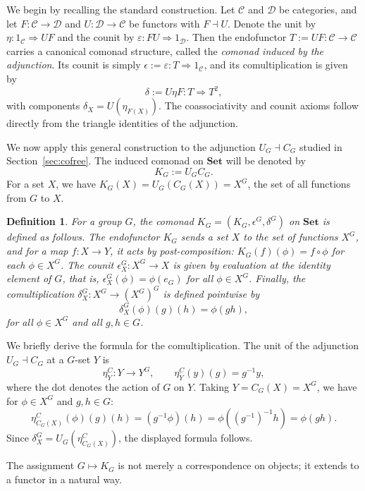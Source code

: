 \documentclass{amsart}
\newtheorem{definition}{Definition}
\begin{document}
 
We begin by recalling the standard construction. Let $\mathcal C$ and $\mathcal D$ be categories, and let $F \colon \mathcal C \rightarrow \mathcal D$ and $U \colon \mathcal D \rightarrow \mathcal C$ be functors with $F \dashv U$.  Denote the unit by $\eta \colon 1_{\mathcal C} \Rightarrow U F$ and the counit by $\varepsilon \colon F U \Rightarrow 1_{\mathcal D}$. Then the endofunctor $T := U F \colon \mathcal C \rightarrow \mathcal C$ carries a canonical comonad structure, called the \emph{comonad induced by the adjunction}. Its counit is simply $\epsilon := \varepsilon \colon T \Rightarrow 1_{\mathcal C}$, and its comultiplication is given by
\[
\delta := U \eta F \colon T \Rightarrow T^2,
\]
with components $\delta_X = U(\eta_{F(X)})$. The coassociativity and counit axioms follow directly from the triangle identities of the adjunction.


We now apply this general construction to the adjunction $U_G \dashv C_G$ studied in Section~\ref{sec:cofree}. The induced comonad on $\mathbf{Set}$ will be denoted by
\[
K_G := U_G C_G.
\]
For a set $X$, we have $K_G(X) = U_G(C_G(X)) = X^G$, the set of all functions from $G$ to $X$.

\begin{definition}
For a group $G$, the comonad $K_G = (K_G, \epsilon^G, \delta^G)$ on $\mathbf{Set}$ is defined as follows. The endofunctor $K_G$ sends a set $X$ to the set of functions $X^G$, and for a map $f: X \rightarrow Y$, it acts by post-composition: $K_G(f)(\phi) = f \circ \phi$ for each $\phi \in X^G$. The counit $\epsilon_X^G: X^G \rightarrow X$ is given by evaluation at the identity element of $G$, that is, $\epsilon_X^G(\phi) = \phi(e_G)$ for all $\phi \in X^G$. Finally, the comultiplication $\delta_X^G: X^G \rightarrow (X^G)^G$ is defined pointwise by
\[
\delta_X^G(\phi)(g)(h) = \phi(gh),
\]
for all $\phi \in X^G$ and all $g, h \in G$.
\end{definition}

We briefly derive the formula for the comultiplication. The unit of the adjunction $U_G \dashv C_G$ at a $G$-set $Y$ is
\[
\eta^C_Y \colon Y \rightarrow Y^G, \qquad \eta^C_Y(y)(g) = g^{-1}y,
\]
where the dot denotes the action of $G$ on $Y$. 
Taking $Y = C_G(X) = X^G$, we have for $\phi \in X^G$ and $g,h \in G$:
\[
\eta^C_{C_G(X)}(\phi)(g)(h) = (g^{-1}\phi)(h) = \phi((g^{-1})^{-1}h) = \phi(g h).
\]
Since $\delta^G_X = U_G(\eta^C_{C_G(X)})$, the displayed formula follows.
 
The assignment $G \mapsto K_G$ is not merely a correspondence on objects; it extends to a functor in a natural way.
\end{document}
